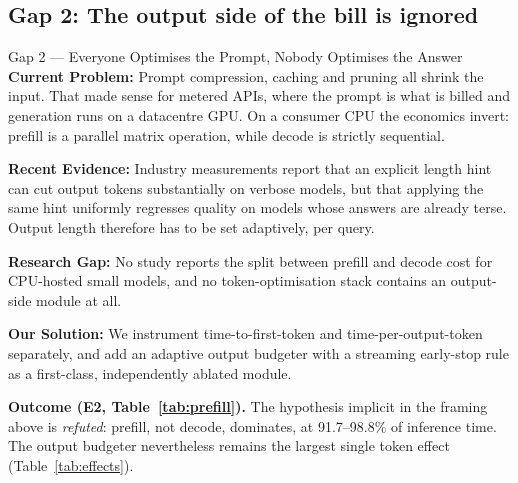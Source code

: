 \documentclass[11pt,a4paper]{article}
\newcommand{\lbl}[1]{\textcolor{accent}{\textbf{#1}}}
\begin{document}
\subsection{Gap 2: The output side of the bill is ignored}
\begin{gap}{Gap 2 --- Everyone Optimises the Prompt, Nobody Optimises the Answer}
\lbl{Current Problem:} Prompt compression, caching and pruning all shrink the
input. That made sense for metered APIs, where the prompt is what is billed and
generation runs on a datacentre GPU. On a consumer CPU the economics invert:
prefill is a parallel matrix operation, while decode is strictly sequential.

\lbl{Recent Evidence:} Industry measurements report that an explicit length hint
can cut output tokens substantially on verbose models, but that applying the same
hint uniformly regresses quality on models whose answers are already terse.
Output length therefore has to be set adaptively, per query.

\lbl{Research Gap:} No study reports the split between prefill and decode cost
for CPU-hosted small models, and no token-optimisation stack contains an
output-side module at all.

\lbl{Our Solution:} We instrument time-to-first-token and time-per-output-token
separately, and add an adaptive output budgeter with a streaming early-stop rule
as a first-class, independently ablated module.
\end{gap}
\noindent\textbf{Outcome (E2, Table~\ref{tab:prefill}).} The hypothesis implicit
in the framing above is \emph{refuted}: prefill, not decode, dominates, at
91.7--98.8\% of inference time. The output budgeter nevertheless remains the
largest single token effect (Table~\ref{tab:effects}).
\end{document}
